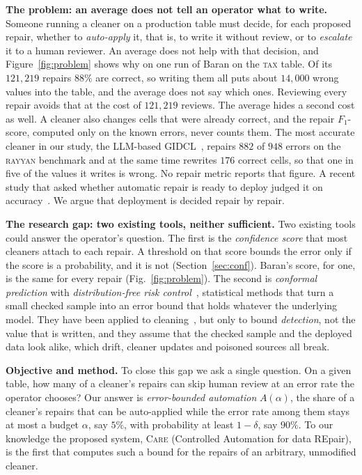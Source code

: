 \documentclass[sigconf, nonacm, balance=false]{acmart}
\theoremstyle{remark}
\begin{document}
\textbf{The problem: an average does not tell an operator what to write.} Someone
running a cleaner on a production table must decide, for each proposed repair, whether
to \emph{auto-apply} it, that is, to write it without review, or to \emph{escalate} it
to a human reviewer. An average does not help with that decision, and
Figure~\ref{fig:problem} shows why on one run of Baran on the \textsc{tax} table. Of
its $121{,}219$ repairs $88\%$ are correct, so writing them all puts about $14{,}000$
wrong values into the table, and the average does not say which ones. Reviewing every
repair avoids that at the cost of $121{,}219$ reviews. The average hides a second cost
as well. A cleaner also changes cells that were already correct, and the repair
$F_1$-score, computed only on the known errors, never counts them. The most accurate
cleaner in our study, the LLM-based GIDCL~\cite{10.1145/3698811}, repairs $882$ of
$948$ errors on the \textsc{rayyan} benchmark and at the same time rewrites $176$
correct cells, so that one in five of the values it writes is wrong. No repair metric
reports that figure. A recent study that asked whether automatic repair is ready to
deploy judged it on accuracy~\cite{10.14778/3675034.3675051}. We argue that deployment
is decided repair by repair.

\textbf{The research gap: two existing tools, neither sufficient.} Two existing tools
could answer the operator's question. The first is the \emph{confidence score} that
most cleaners attach to each repair. A threshold on that score bounds the error only if
the score is a probability, and it is not (Section~\ref{sec:conf}). Baran's score, for
one, is the same for every repair (Fig.~\ref{fig:problem}). The second is
\emph{conformal prediction} with \emph{distribution-free risk
control}~\cite{10.1007/b106715, 10.1561/2200000101, 10.1214/24-AOAS1998,
10.1145/3478535}, statistical methods that turn a small checked sample into an error
bound that holds whatever the underlying model. They have been applied to
cleaning~\cite{pmlr-v238-jager24a}, but only to bound \emph{detection}, not the value
that is written, and they assume that the checked sample and the deployed data look
alike, which drift, cleaner updates and poisoned sources all break.

\textbf{Objective and method.} To close this gap we ask a single question. On a given
table, how many of a cleaner's repairs can skip human review at an error rate the
operator chooses? Our answer is \emph{error-bounded automation} $A(\alpha)$, the share
of a cleaner's repairs that can be auto-applied while the error rate among them stays
at most a budget $\alpha$, say $5\%$, with probability at least $1-\delta$, say $90\%$.
To our knowledge the proposed system, \textsc{Care} (Controlled Automation for data
REpair), is the first that computes such a bound for the repairs of an arbitrary,
unmodified cleaner.
\end{document}

